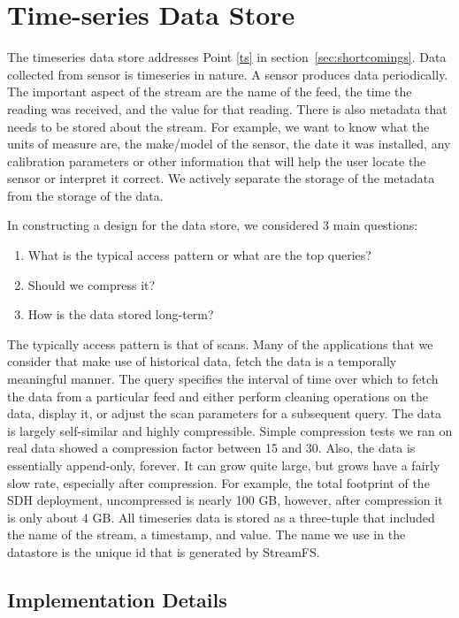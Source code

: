 \section{Time-series Data Store}

The timeseries data store addresses Point \ref{ts} in section~\ref{sec:shortcomings}.
Data collected from sensor is timeseries in nature.  A sensor produces data periodically.  The important aspect of
the stream are the name of the feed, the time the reading was received, and the value for that reading.  There is also
metadata that needs to be stored about the stream.  For example, we want to know what the units of measure are, 
the make/model of the sensor, the date it was installed, any calibration parameters or other information that will help 
the user locate the sensor or interpret it correct.  We actively separate the storage of the metadata from the storage 
of the data.

In constructing a design for the data store, we considered 3 main questions:

\begin{enumerate}
\item What is the typical access pattern or what are the top queries?
\item Should we compress it?
\item How is the data stored long-term?
\end{enumerate}

The typically access pattern is that of scans.  Many of the applications that we consider that make use of historical data, fetch the data
is a temporally meaningful manner.  The query specifies the interval of time over which to fetch the data from a particular feed
and either perform cleaning operations on the data, display it, or adjust the scan parameters for a subsequent query.
The data is largely self-similar and highly compressible.  Simple compression tests we ran on real data showed a compression factor 
between 15 and 30.  Also, the data is essentially append-only, forever.  It can grow quite large, but grows have a fairly 
slow rate, especially after compression.  For example, the total footprint of the SDH deployment, uncompressed 
is nearly 100 GB, however, after compression it is only about 4 GB.
All timeseries data is stored as a three-tuple that included the name of the stream, a timestamp, and value.  The name we use in
the datastore is the unique id that is generated by StreamFS.  %

\subsection{Implementation Details}

